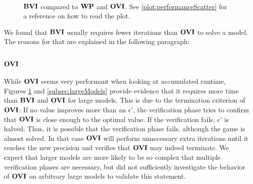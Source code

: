 \begin{figure}[h!]
    \centering
    \
    \caption{$\mathbf{BVI}$ compared to $\mathbf{WP}$ and $\mathbf{OVI}$. See \ref{plot:performanceScatter} for a reference on how to read the plot.}%
    \label{fig:BVIvsWPvsOVI}%
    \end{figure}
\FloatBarrier

We found that $\mathbf{BVI}$ usually requires fewer iterations than $\mathbf{OVI}$ to solve a model.
The reasons for that are explained in the following paragraph:

\subsubsection*{\underline{$\mathbf{OVI}$}}
While $\mathbf{OVI}$ seems very performant when looking at accumulated runtime, Figures \ref{fig:BVIvsWPvsOVI} and \ref{subsec:largeModels} provide evidence that it requires more time than $\mathbf{BVI}$ and $\mathbf{OVI}$ for large models.
This is due to the termination criterion of $\mathbf{OVI}$: 
If no value improves more than an $\epsilon'$, the verification phase tries to confirm that $\mathbf{OVI}$ is close enough to the optimal value.
If the verification fails, $\epsilon'$ is halved. 
Thus, it is possible that the verification phase fails, although the game is almost solved.
In that case $\mathbf{OVI}$ will perform unnecessary extra iterations until it reaches the new precision and verifies that $\mathbf{OVI}$ may indeed terminate.
We expect that larger models are more likely to be so complex that multiple verification phases are necessary, 
but did not sufficiently investigate the behavior of $\mathbf{OVI}$ on arbitrary large models to validate this statement.

